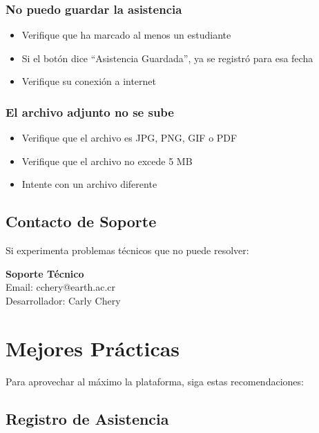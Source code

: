 \documentclass[11pt,a4paper]{article}
\begin{document}
\subsubsection{No puedo guardar la asistencia}
\begin{itemize}
  \item Verifique que ha marcado al menos un estudiante
  \item Si el botón dice ``Asistencia Guardada'', ya se registró para esa fecha
  \item Verifique su conexión a internet
\end{itemize}

\subsubsection{El archivo adjunto no se sube}
\begin{itemize}
  \item Verifique que el archivo es JPG, PNG, GIF o PDF
  \item Verifique que el archivo no excede 5 MB
  \item Intente con un archivo diferente
\end{itemize}

\subsection{Contacto de Soporte}

Si experimenta problemas técnicos que no puede resolver:

\begin{center}
\begin{tcolorbox}[colback=lightgreen,colframe=primarygreen,width=10cm]
\centering
\textbf{Soporte Técnico}\\[5pt]
Email: cchery@earth.ac.cr\\[3pt]
Desarrollador: Carly Chery
\end{tcolorbox}
\end{center}

\section{Mejores Prácticas}

Para aprovechar al máximo la plataforma, siga estas recomendaciones:

\subsection{Registro de Asistencia}
\end{document}
